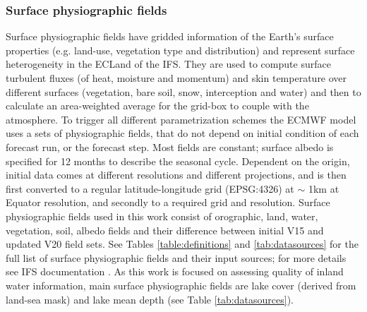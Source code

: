 \documentclass[hess, twostagejnl]{copernicus}
\begin{document}
\subsubsection{Surface physiographic fields}\label{sec:surface_physio}
\noindent Surface physiographic fields have gridded information of the Earth’s surface properties (e.g. land-use, vegetation type and distribution) and represent surface heterogeneity in the ECLand of the IFS. They are used to compute surface turbulent fluxes (of heat, moisture and momentum) and skin temperature over different surfaces (vegetation, bare soil, snow, interception and water) and then to calculate an area-weighted average for the grid-box to couple with the atmosphere. To trigger all different parametrization schemes the ECMWF model uses a sets of physiographic fields, that do not depend on initial condition of each forecast run, or the forecast step. Most fields are constant; surface albedo is specified for 12 months to describe the seasonal cycle. Dependent on the origin, initial data comes at different resolutions and different projections, and is then first converted to a regular latitude-longitude grid (EPSG:4326) at $\sim$ 1km at Equator resolution, and secondly to a required grid and resolution. Surface physiographic fields used in this work consist of orographic, land, water, vegetation, soil, albedo fields and their difference between initial V15 and updated V20 field sets. See Tables \ref{table:definitions} and \ref{tab:datasources} for the full list of surface physiographic fields and their input sources; for more details see IFS documentation \citep{IFSdocs}. As this work is focused on assessing quality of inland water information, main surface physiographic fields are lake cover (derived from land-sea mask) and lake mean depth (see Table \ref{tab:datasources}).  \newline 
\end{document}
